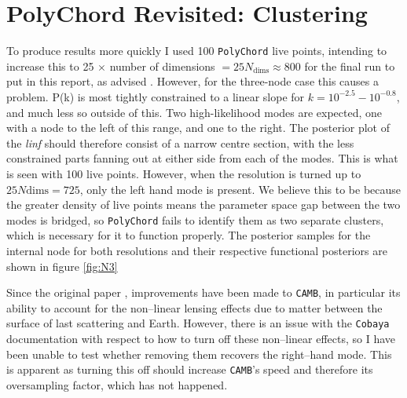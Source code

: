 \documentclass{article}
\begin{document}
\newpage

\section{PolyChord Revisited: Clustering}
\label{sec:polychord_revisited}

To produce results more quickly I used 100 \texttt{PolyChord} live points, intending to increase this to 25 $\times$ number of dimensions $= 25 N_\textrm{dims} \approx800$ for the final run to put in this report, as advised \cite{PolyChord_1, PolyChord_2, Sonke}. However, for the three-node case this causes a problem. P(k) is most tightly constrained to a linear slope for $k = 10^{-2.5} - 10^{-0.8}$, and much less so outside of this. Two high-likelihood modes are expected, one with a node to the left of this range, and one to the right. The posterior plot of the \textit{linf} should therefore consist of a narrow centre section, with the less constrained parts fanning out at either side from each of the modes. This is what is seen with 100 live points. However, when the resolution is turned up to $25N\textrm{dims}=725$, only the left hand mode is present. We believe this to be because the greater density of live points means the parameter space gap between the two modes is bridged, so \texttt{PolyChord} fails to identify them as two separate clusters, which is necessary for it to function properly. The posterior samples for the internal node for both resolutions and their respective functional posteriors are shown in figure \ref{fig:N3}

Since the original paper \cite{Handley2019}, improvements have been made to \texttt{CAMB}, in particular its ability to account for the non--linear lensing effects due to matter between the surface of last scattering and Earth. However, there is an issue with the \texttt{Cobaya} documentation with respect to how to turn off these non--linear effects, so I have been unable to test whether removing them recovers the right--hand mode. This is apparent as turning this off should increase \texttt{CAMB}'s speed and therefore its oversampling factor, which has not happened.
\end{document}
